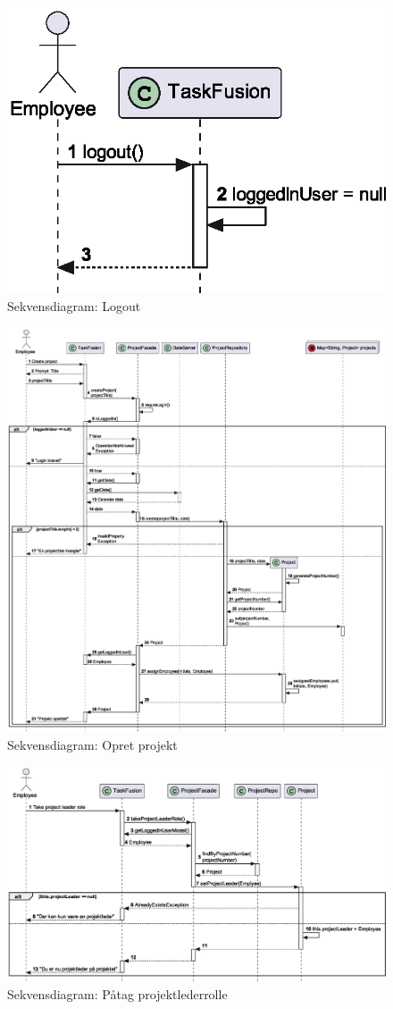 \begin{figure}[H]
    \centering
    \caption{Sekvensdiagram: Logout}\label{fig:sequenceLogout}
    \includegraphics[width=.3\textwidth]{RequirementsAndDesign/SequenceDiagrams/seqLogout.eps}
\end{figure}
\begin{figure}[H]
    \centering
    \caption{Sekvensdiagram: Opret projekt}\label{fig:sequenceCreateProject}
    \includegraphics[width=\textwidth]{RequirementsAndDesign/SequenceDiagrams/seqCreateProject.eps}
\end{figure}
\begin{figure}[H]
    \centering
    \caption{Sekvensdiagram: Påtag projektlederrolle}\label{fig:sequenceTakePLRole}
    \includegraphics[width=\textwidth]{RequirementsAndDesign/SequenceDiagrams/seqTakePLRole.eps}
\end{figure}
